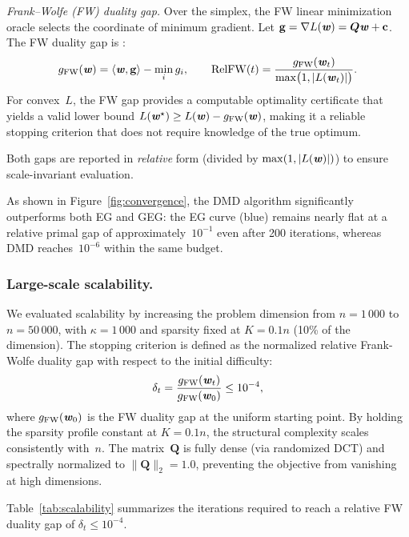 \documentclass[10pt]{amsart}
\newcommand{\bi}[1]{\textbf{\textit{#1}}}
\newcommand{\bQ}{\boldsymbol{Q}}
\theoremstyle{definition}
\theoremstyle{definition}	 %
\begin{document}
\emph{Frank--Wolfe (FW) duality gap.}
Over the simplex, the FW linear minimization oracle selects the
coordinate of minimum gradient.  Let
$\mathbf{g}=\nabla L(\bi w)=\bQ \bi w+\mathbf{c}$.  The FW
duality gap is \cite{Jaggi2013,Bach2015}:
\begin{equation}\label{eq:FWgap}
  g_{\mathrm{FW}}(\bi w)
  =\langle\bi w,\mathbf{g}\rangle-\min_i g_i,\qquad
  \mathrm{RelFW}(t)
  =\frac{g_{\mathrm{FW}}(\bi w_t)}
       {\max \bigl(1,|L(\bi w_t)|\bigr)}.
\end{equation}
For convex~$L$, the FW gap provides a computable optimality
certificate that yields a valid lower bound
$L(\bi w^\star)\ge L(\bi w)-g_{\mathrm{FW}}(\bi w)$,
making it a reliable stopping criterion that does not require knowledge
of the true optimum.

Both gaps are reported in \emph{relative} form (divided by
$\max(1,|L(\bi w)|)$) to ensure scale-invariant evaluation.

As shown in Figure~\ref{fig:convergence}, the DMD algorithm
significantly outperforms both EG and GEG: the EG curve (blue) remains
nearly flat at a relative primal gap of approximately~$10^{-1}$ even
after 200 iterations, whereas DMD reaches~$10^{-6}$ within the same
budget.

\subsubsection{Large-scale scalability.}
We evaluated scalability by increasing the problem dimension from
$n=1\,000$ to $n=50\,000$, with $\kappa=1\,000$ and sparsity fixed
at $K=0.1n$ (10\% of the dimension).  The stopping criterion is defined as the normalized relative Frank-Wolfe duality gap with respect to the initial difficulty:
\[
  \delta_t=\frac{g_{\mathrm{FW}}(\bi w_t)}
  {g_{\mathrm{FW}}(\bi{w}_0)}\le 10^{-4},
\]
where $g_{\mathrm{FW}}(\bi{w}_0)$ is the FW duality gap at the
uniform starting point.  By holding the sparsity profile constant at
$K=0.1n$, the structural complexity scales consistently with~$n$.
The matrix~$\bQ$ is fully dense (via randomized DCT) and spectrally
normalized to $\|\bQ\|_2=1.0$, preventing the objective from vanishing
at high dimensions.

Table~\ref{tab:scalability} summarizes the iterations required to
reach a relative FW duality gap of $\delta_t\le 10^{-4}$.
\end{document}
